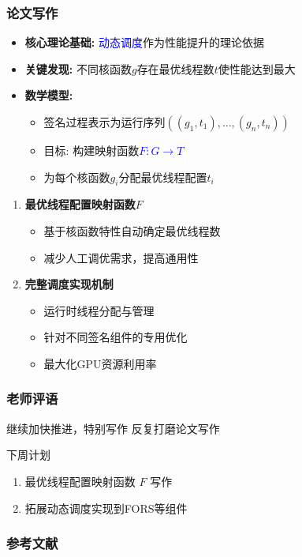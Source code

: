 \documentclass[slide]{../../custom}
\begin{document}
\begin{frame}
  \frametitle{论文写作️}
  \begin{itemize}
    \item \textbf{核心理论基础:} \textcolor{blue}{动态调度}作为性能提升的理论依据
    \item \textbf{关键发现:} 不同核函数$g$存在最优线程数$t$使性能达到最大
    \item \textbf{数学模型:}
      \begin{itemize}
        \item 签名过程表示为运行序列$((g_1,t_1),\dots,(g_n,t_n))$
        \item 目标: 构建映射函数\textcolor{blue}{$F:G\rightarrow T$}
        \item 为每个核函数$g_i$分配最优线程配置$t_i$
      \end{itemize}
  \end{itemize}
  \vfill

  \begin{enumerate}
    \item \textbf{最优线程配置映射函数$F$}
      \begin{itemize}
        \item 基于核函数特性自动确定最优线程数
        \item 减少人工调优需求，提高通用性
      \end{itemize}

    \item \textbf{完整调度实现机制}
      \begin{itemize}
        \item 运行时线程分配与管理
        \item 针对不同签名组件的专用优化
        \item 最大化GPU资源利用率
      \end{itemize}
  \end{enumerate}
\end{frame}

\begin{frame}
  \frametitle{老师评语}

  \begin{alertblock}{继续加快推进，特别写作}
    反复打磨论文写作
  \end{alertblock}
  \vfill
  \begin{block}{下周计划}
    \begin{enumerate}
      \item 最优线程配置映射函数 $F$ 写作
      \item 拓展动态调度实现到FORS等组件
    \end{enumerate}
  \end{block}

\end{frame}

\begin{frame}
  \frametitle{参考文献}
  
  
\end{frame}
\end{document}
